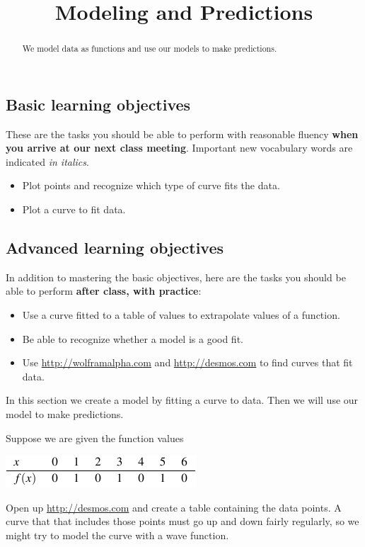 \documentclass{ximera}
\title{Modeling and Predictions}
\begin{document}
\begin{abstract}
We model data as functions and use our models to make predictions.
\end{abstract}
\maketitle

\subsection*{Basic learning objectives}

These are the tasks you should be able to perform with reasonable fluency \textbf{when you arrive at our next class meeting}. Important new vocabulary words are indicated \emph{in italics}. 

\begin{itemize}
	\item Plot points and recognize which type of curve fits the data.
	\item Plot a curve to fit data.
\end{itemize}

\subsection*{Advanced learning objectives}

In addition to mastering the basic objectives, here are the tasks you should be able to perform \textbf{after class, with practice}: 

\begin{itemize}
	\item Use a curve fitted to a table of values to extrapolate values of a function.
    \item Be able to recognize whether a model is a good fit.
    \item Use \href{http://wolframalpha.com}{http://wolframalpha.com} and \href{http://desmos.com}{http://desmos.com} to find curves that fit data.
\end{itemize}

\noindent\hrulefill

In this section we create a model by fitting a curve to data. Then we will use our model to make predictions.

Suppose we are given the function values 
\begin{image}
\includegraphics{ModelingTable1.png}
\end{image}
Open up \href{http://desmos.com}{http://desmos.com} and create a table containing the data points. A curve that that includes those points must go up and down fairly regularly, so we might try to model the curve with a wave function.
\end{document}
